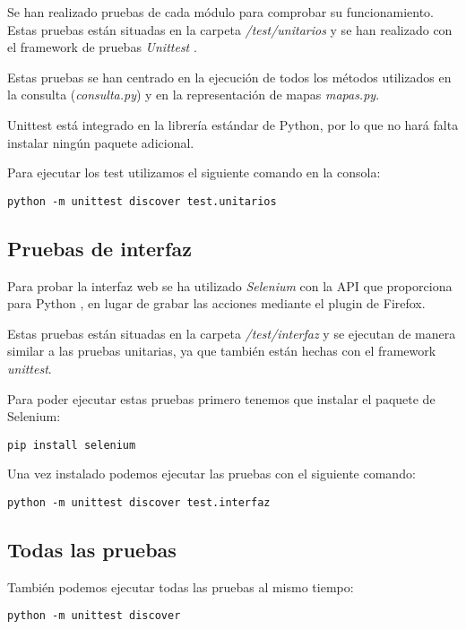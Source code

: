 Se han realizado pruebas de cada módulo para comprobar su funcionamiento. Estas pruebas están situadas en la carpeta \textit{/test/unitarios} y se han realizado con el framework de pruebas \textit{Unittest} \cite{misc:unittest}.

Estas pruebas se han centrado en la ejecución de todos los métodos utilizados en la consulta (\textit{consulta.py}) y en la representación de mapas \textit{mapas.py}.

Unittest está integrado en la librería estándar de Python, por lo que no hará falta instalar ningún paquete adicional. 

Para ejecutar los test utilizamos el siguiente comando en la consola:

\begin{lstlisting}
python -m unittest discover test.unitarios
\end{lstlisting}

\subsection{Pruebas de interfaz}

Para probar la interfaz web se ha utilizado \textit{Selenium} con la API que proporciona para Python \cite{misc:seleniumpython}, en lugar de grabar las acciones mediante el plugin de Firefox.

Estas pruebas están situadas en la carpeta \textit{/test/interfaz} y se ejecutan de manera similar a las pruebas unitarias, ya que también están hechas con el framework \textit{unittest}.

Para poder ejecutar estas pruebas primero tenemos que instalar el paquete de Selenium:

\begin{lstlisting}
pip install selenium
\end{lstlisting}

Una vez instalado podemos ejecutar las pruebas con el siguiente comando:

\begin{lstlisting}
python -m unittest discover test.interfaz
\end{lstlisting}

\subsection{Todas las pruebas}

También podemos ejecutar todas las pruebas al mismo tiempo:

\begin{lstlisting}
python -m unittest discover
\end{lstlisting}